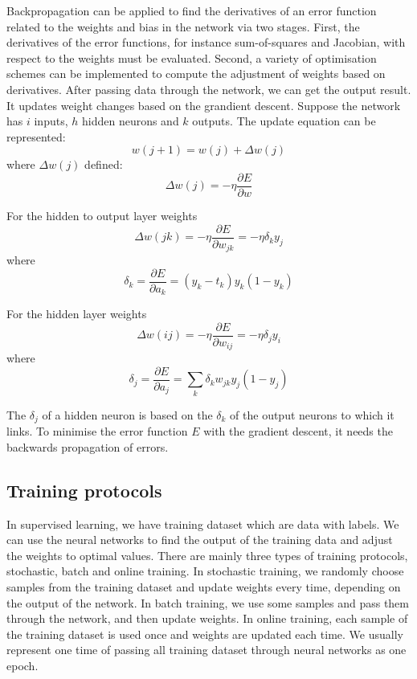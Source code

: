 Backpropagation can be applied to find the derivatives of an error function related to the weights and bias in the network via two stages. First, the derivatives of the error functions, for instance sum-of-squares and Jacobian, with respect to the weights must be evaluated. Second, a variety of optimisation schemes can be implemented to compute the adjustment of weights based on derivatives. After passing data through the network, we can get the output result. It updates weight changes based on the grandient descent. Suppose the network has $i$ inputs, $h$ hidden neurons and $k$ outputs. The update equation can be represented: 
\begin{equation}\label{eq:UpdateWeights}
w(j+1) = w(j) + \Delta w(j)
\end{equation}
where $\Delta w(j)$ defined: 
\begin{equation}\label{eq:DeltaWeights}
\Delta w(j) = -\eta \frac{\partial E}{\partial w}
\end{equation}

For the hidden to output layer weights
\begin{equation}\label{eq:h2oBP}
\Delta w(jk) = -\eta \frac{\partial E}{\partial w_{jk}} = -\eta \delta_{k}y_{j}
\end{equation}
where $$\delta_{k} = \frac{\partial E}{\partial a_{k}} = (y_{k} - t_{k})y_{k}(1 - y_{k})$$

For the hidden layer weights
\begin{equation}\label{eq:hiddenBP}
\Delta w(ij) = -\eta \frac{\partial E}{\partial w_{ij}} = -\eta \delta_{j}y_{i}
\end{equation}
where $$\delta_{j} = \frac{\partial E}{\partial a_{j}} = \displaystyle\sum_{k} \delta_{k}w_{jk}y_{j}(1 - y_{j})$$

The $\delta_{j}$ of a hidden neuron is based on the $\delta_{k}$ of the output neurons to which it links. To minimise the error function $E$ with the gradient descent, it needs the backwards propagation of errors.

\subsection{Training protocols}

In supervised learning, we have training dataset which are data with labels. We can use the neural networks to find the output of the training data and adjust the weights to optimal values. There are mainly  three types of training protocols, stochastic, batch and online training. In stochastic training, we randomly choose samples from the training dataset and update weights every time, depending on the output of the network. In batch training, we use some samples and pass them through the network, and then update weights. In online training, each sample of the training dataset is used once and weights are updated each time. We usually represent one time of passing all training dataset through neural networks as one epoch.

